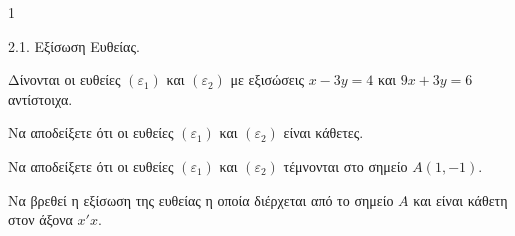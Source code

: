\begin{ylh}{1}
    \item 2.1. Εξίσωση Ευθείας.
\end{ylh}
Δίνονται οι ευθείες $(\varepsilon_1)$ και $(\varepsilon_2)$ με εξισώσεις $x - 3y = 4$ και $9x + 3y = 6$ αντίστοιχα.
\begin{alist}
\item Να αποδείξετε ότι οι ευθείες $(\varepsilon_1)$ και $(\varepsilon_2)$ είναι κάθετες. 
\item Να αποδείξετε ότι οι ευθείες $(\varepsilon_1)$ και $(\varepsilon_2)$ τέμνονται στο σημείο $A(1, -1)$. 
\item Να βρεθεί η εξίσωση της ευθείας η οποία διέρχεται από το σημείο $A$ και είναι κάθετη στον άξονα $x'x$. 
\end{alist}